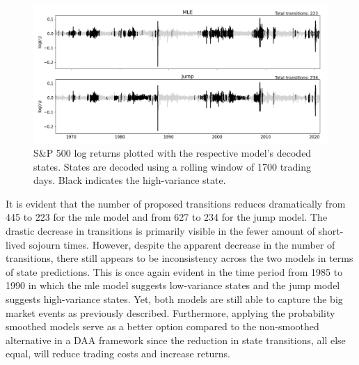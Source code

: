 \begin{figure}[H] 
    \centering
    \includegraphics[width=1.0\textwidth]{analysis/stylized_facts/images/decoded_states_filter.png}
    \caption{S\&P 500 log returns plotted with the respective model's decoded states. States are decoded using a rolling window of 1700 trading days.  Black indicates the high-variance state.}
    \label{fig:stylized_facts_decoded_states_filtered} 
\end{figure}

It is evident that the number of proposed transitions reduces dramatically from 445 to 223 for the mle model and from 627 to 234 for the jump model. The drastic decrease in transitions is primarily visible in the fewer amount of short-lived sojourn times. However, despite the apparent decrease in the number of transitions, there still appears to be inconsistency across the two models in terms of state predictions. This is once again evident in the time period from 1985 to 1990 in which the mle model suggests low-variance states and the jump model suggests high-variance states. Yet, both models are still able to capture the big market events as previously described. Furthermore, applying the probability smoothed models serve as a better option compared to the non-smoothed alternative in a DAA framework since the reduction in state transitions, all else equal, will reduce trading costs and increase returns. 

